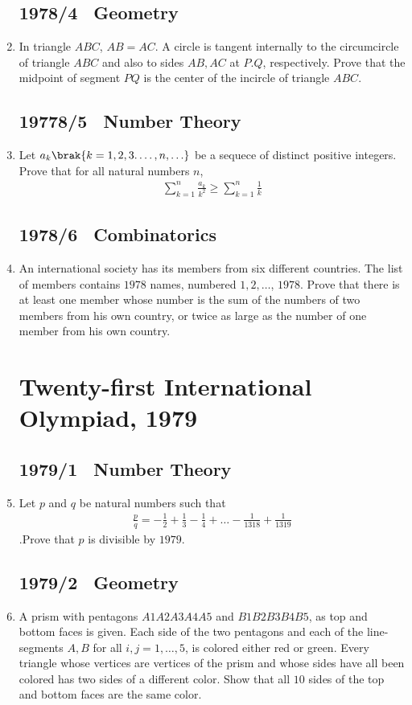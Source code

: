 \documentclass[12pt,-letter paper] {article}
\begin{document}
\begin{enumerate}
\subsection*{1978/4 \ Geometry}
\item In triangle $ABC$, $AB = AC$. A circle is tangent internally to the circumcircle of triangle $ABC$ and also to sides $AB, AC$ at $P. Q$, respectively. Prove that the midpoint of segment $PQ$ is the center of the incircle of triangle $ABC.$
\subsection*{19778/5 \ Number Theory}
\item Let ${a_{k}\brak{k=1,2,3.\ldots,n,\ldots}}$ be a sequece of distinct positive integers. Prove that for all natural numbers $n$,\begin{align}\sum_{k=1}^{n} \frac{a_{k}}{k^2} \geq \sum_{k=1}^{n} \frac{1}{k}\end{align}
\subsection*{1978/6 \ Combinatorics}
	\item An international society has its members from six different countries. The list of members contains $1978$ names, numbered $1, 2,\ldots$, $1978$. Prove that there is at least one member whose number is the sum of the numbers of two members from his own country, or twice as large as the number of one member from his own country.

	\newpage \section*{Twenty-first International Olympiad, 1979}
\subsection*{1979/1 \ Number Theory}		
\item Let $p$ and $q$ be natural numbers such that \begin{align}\frac{p}{q}=-\frac{1}{2}+\frac{1}{3}-\frac{1}{4}+\ldots -\frac{1}{1318}+\frac{1}{1319}\end{align}.Prove that $p$ is divisible by $1979$.
\subsection*{1979/2 \ Geometry}
	\item A prism with pentagons $A1 A2 A3 A4 A5$ and $B1 B2 B3 B4 B5$, as top and bottom faces is given. Each side of the two pentagons and each of the line- segments $A,B$ for all $i, j = 1 ,\ldots,5$, is colored either red or green. Every triangle whose vertices are vertices of the prism and whose sides have all been colored has two sides of a different color. Show that all $10$ sides of the top and bottom faces are the same color.

\end{enumerate}
\end{document}

